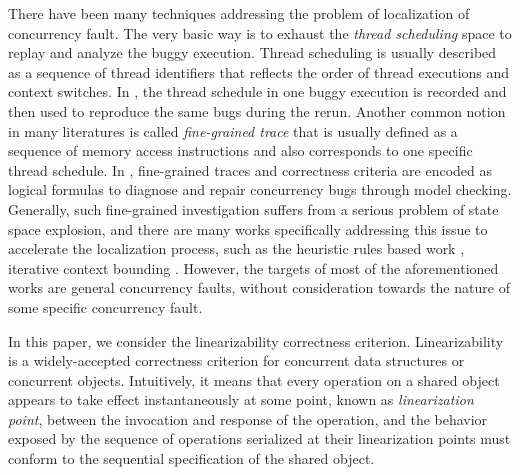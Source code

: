 \documentclass[runningheads]{llncs}
\begin{document}
There have been many techniques addressing the problem of localization of concurrency fault. The very basic way is to
exhaust the \textit{thread scheduling} space to replay and analyze the buggy execution.
Thread scheduling is usually described as a sequence of thread identifiers that reflects the order of thread executions and context switches.
 In \cite{Choi2000Deterministic,DBLP:journals/concurrency/EdelsteinFGNRU03,DBLP:journals/entcs/Stoller02}, 
 the thread schedule in one buggy execution is recorded and then used to reproduce the same bugs during the rerun. 
Another common notion in many literatures is called \textit{fine-grained trace} that is usually defined as a sequence of memory access instructions and 
 also corresponds to one specific thread schedule.
 In \cite{DBLP:conf/issta/KhoshnoodKW15}, 
 fine-grained traces and correctness criteria are encoded as logical formulas to diagnose and repair concurrency bugs through model checking. 
 Generally, such fine-grained investigation suffers from a serious problem of state space explosion, and
 there are many works specifically addressing this issue to accelerate the localization process, such as the heuristic rules based work
 \cite{Ben2003Heuristics}, iterative context bounding \cite{DBLP:conf/pldi/MusuvathiQ07}. 
 However, the targets of most of the aforementioned works are general concurrency faults, without consideration towards the nature of some specific concurrency fault.

In this paper, we consider the linearizability correctness criterion. Linearizability \cite{DBLP:journals/toplas/HerlihyW90} is a widely-accepted correctness criterion for concurrent data structures or concurrent objects. 
Intuitively, it means that every operation on a shared object appears to take effect instantaneously at some point, known as \textit{linearization point}, 
between the invocation and response of the operation, and the behavior exposed by the sequence of operations serialized at their linearization points must conform to the sequential specification of the shared object.
\end{document}
